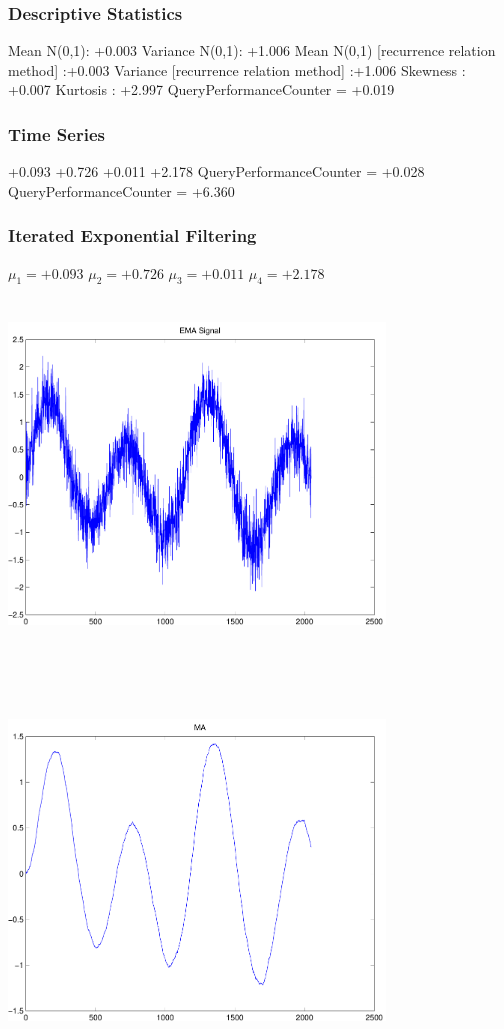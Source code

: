 \documentclass[9pt]{article}
\theoremstyle{plain}
\theoremstyle{definition}
\theoremstyle{remark}
\numberwithin{equation}{section}
\begin{document}
\subsubsection{Descriptive Statistics}
Mean N(0,1): +0.003
Variance N(0,1): +1.006
Mean N(0,1) [recurrence relation method] :+0.003
Variance [recurrence relation method] :+1.006
Skewness : +0.007
Kurtosis : +2.997
QueryPerformanceCounter  =  +0.019
\subsubsection{Time Series }
+0.093
+0.726
+0.011
+2.178
QueryPerformanceCounter  =  +0.028
QueryPerformanceCounter  =  +6.360
\subsubsection{Iterated Exponential Filtering }
$\mu_1 =+0.093$
$\mu_2 =+0.726$
$\mu_3 =+0.011$
$\mu_4 =+2.178$
\includegraphics[width=10.0cm,height=10.0cm]{EMA_signal.pdf}

\includegraphics[width=10.0cm,height=10.0cm]{MA.pdf}
\end{document}
